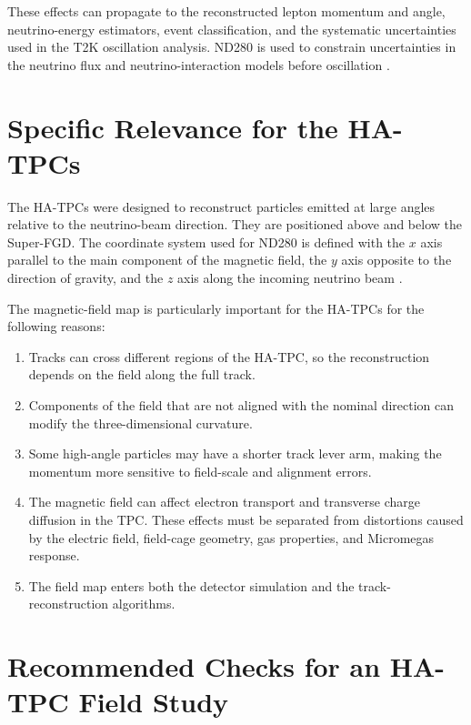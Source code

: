 These effects can propagate to the reconstructed lepton momentum and angle, neutrino-energy estimators, event classification, and the systematic uncertainties used in the T2K oscillation analysis. ND280 is used to constrain uncertainties in the neutrino flux and neutrino-interaction models before oscillation \cite{HATPCPerformance}.

\section{Specific Relevance for the HA-TPCs}

The HA-TPCs were designed to reconstruct particles emitted at large angles relative to the neutrino-beam direction. They are positioned above and below the Super-FGD. The coordinate system used for ND280 is defined with the $x$ axis parallel to the main component of the magnetic field, the $y$ axis opposite to the direction of gravity, and the $z$ axis along the incoming neutrino beam \cite{HATPCPerformance}.

The magnetic-field map is particularly important for the HA-TPCs for the following reasons:
\begin{enumerate}[leftmargin=*]
  \item Tracks can cross different regions of the HA-TPC, so the reconstruction depends on the field along the full track.
  \item Components of the field that are not aligned with the nominal direction can modify the three-dimensional curvature.
  \item Some high-angle particles may have a shorter track lever arm, making the momentum more sensitive to field-scale and alignment errors.
  \item The magnetic field can affect electron transport and transverse charge diffusion in the TPC. These effects must be separated from distortions caused by the electric field, field-cage geometry, gas properties, and Micromegas response.
  \item The field map enters both the detector simulation and the track-reconstruction algorithms.
\end{enumerate}

\section{Recommended Checks for an HA-TPC Field Study}

